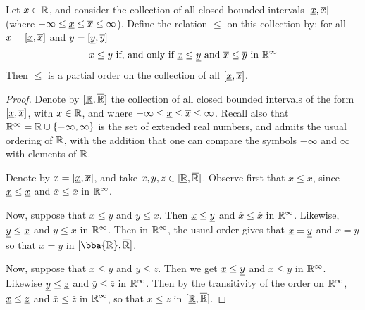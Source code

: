 \begin{proposition}\label{proposition_1.6}
  Let $x \in \mathbb{R}$, and consider the collection of all closed bounded
  intervals $[\underline{x},\overline{x}]$ (where $-\infty \leq \underline{x} \leq
  \overline{x} \leq \infty$). Define the relation $\leq$ on this collection
  by: for all $x=[\underline{x},\overline{x}]$ and $y=[\underline{y},\overline{y}]$
  \begin{equation*}
    x \leq y \text{ if, and only if } \underline{x} \leq \underline{y} \text{
    and } \overline{x} \leq \overline{y} \text{ in } \mathbb{R}^\infty
  \end{equation*}
  Then $\leq$ is a partial order on the collection of all
$[\underline{x},\overline{x}]$.
\end{proposition}
\begin{proof}
  Denote by $[\underline{\mathbb{R}},\overline{\mathbb{R}}]$ the collection of all closed
  bounded intervals of the form $[\underline{x},\overline{x}]$, with $x \in \mathbb{R}$,
  and where $-\infty \leq \underline{x} \leq \overline{x} \leq \infty$. Recall
  also that $\mathbb{R}^\infty=\mathbb{R} \cup \{-\infty,\infty\}$ is the set of
  extended real numbers, and admits the usual ordering of $\mathbb{R}$, with
  the addition that one can compare the symbols  $-\infty$ and
  $\infty$ with elements of $\mathbb{R}$.

  Denote by $x=[\underline{x},\overline{x}]$, and take $x,y,z \in
  [\underline{\mathbb{R}},\overline{\mathbb{R}}]$. Observe first that $x \leq x$, since
  $\underline{x} \leq \underline{x}$ and $\bar{x} \leq \bar{x}$ in $\mathbb{R}^\infty$.

  Now, suppose that $x \leq y$ and $y \leq x$. Then $\underline{x} \leq
  \underline{y}$ and $\bar{x} \leq \bar{x}$ in $\mathbb{R}^\infty$. Likewise,
  $\underline{y} \leq \underline{x}$ and $\bar{y} \leq \bar{x}$ in $\mathbb{R}^\infty$.
  Then in  $\mathbb{R}^\infty$, the usual order gives that $\underline{x}=\underline{y}$
  and $\bar{x}=\bar{y}$ so that $x=y$ in  $[\bba{\R},\bar{\R}]$.

  Now, suppose that $x \leq y$ and $y \leq z$. Then we get $\underline{x}
  \leq \underline{y}$ and $\bar{x} \leq \bar{y}$ in $\mathbb{R}^\infty$. Likewise
  $\underline{y} \leq \underline{z}$ and $\bar{y} \leq \bar{z}$ in $\mathbb{R}^\infty$.
  Then by the transitivity of the order on $\mathbb{R}^\infty$, $\underline{x} \leq
  \underline{z}$ and $\bar{x} \leq \bar{z}$ in $\mathbb{R}^\infty$, so that $x \leq
  z$ in $[\underline{\mathbb{R}},\overline{\mathbb{R}}]$.
\end{proof}
